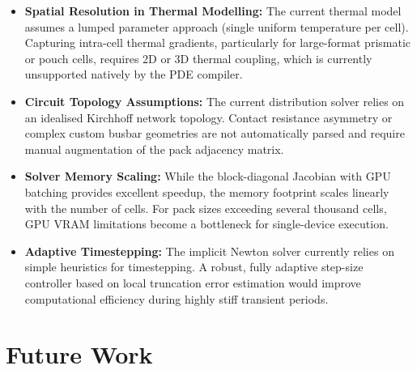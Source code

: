 \begin{itemize}
  \item \textbf{Spatial Resolution in Thermal Modelling:} The current thermal model assumes a lumped parameter approach (single uniform temperature per cell). Capturing intra-cell thermal gradients, particularly for large-format prismatic or pouch cells, requires 2D or 3D thermal coupling, which is currently unsupported natively by the PDE compiler.
  \item \textbf{Circuit Topology Assumptions:} The current distribution solver relies on an idealised Kirchhoff network topology. Contact resistance asymmetry or complex custom busbar geometries are not automatically parsed and require manual augmentation of the pack adjacency matrix.
  \item \textbf{Solver Memory Scaling:} While the block-diagonal Jacobian with GPU batching provides excellent speedup, the memory footprint scales linearly with the number of cells. For pack sizes exceeding several thousand cells, GPU VRAM limitations become a bottleneck for single-device execution.
  \item \textbf{Adaptive Timestepping:} The implicit Newton solver currently relies on simple heuristics for timestepping. A robust, fully adaptive step-size controller based on local truncation error estimation would improve computational efficiency during highly stiff transient periods.
\end{itemize}

\section{Future Work}
\label{sec:future_work}

